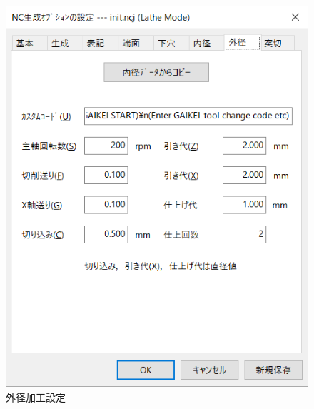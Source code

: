 \begin{minipage}{0.5\textwidth}
\begin{figure}[H]
\centering
\includegraphics[scale=0.7]{No2/fig/ncj4.png}
\caption{外径加工設定}
\label{fig:ncj4.png}
\end{figure}
\end{minipage}

